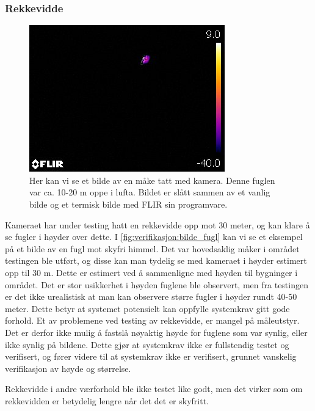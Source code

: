 
\subsubsection{Rekkevidde}\label{sec:verifikasjon:rekkevidde}

\begin{figure}
    \centering
    \includegraphics[width=.42\textwidth]{verifikasjon-test/Kamera/FLIR0059.jpg}
    \caption{Her kan vi se et bilde av en måke tatt med kamera. Denne fuglen var ca. 10-20 m oppe i lufta. Bildet er slått sammen av et vanlig bilde og et termisk bilde med FLIR sin programvare.}
    \label{fig:verifikasjon:bilde_fugl}
\end{figure}

Kameraet har under testing hatt en rekkevidde opp mot 30 meter, og kan klare å se fugler i høyder over dette. 
I \autoref{fig:verifikasjon:bilde_fugl} kan vi se et eksempel på et bilde av en fugl mot skyfri himmel. 
Det var hovedsaklig måker i området testingen ble utført, og disse kan man tydelig se med kameraet i høyder estimert opp til 30 m. 
Dette er estimert ved å sammenligne med høyden til bygninger i området. 
Det er stor usikkerhet i høyden fuglene ble observert, men fra testingen er det ikke urealistisk at man kan observere større fugler i høyder rundt 40-50 meter. 
Dette betyr at systemet potensielt kan oppfylle systemkrav  gitt gode forhold.
Et av problemene ved testing av rekkevidde, er mangel på måleutstyr. 
Det er derfor ikke mulig å fastslå nøyaktig høyde for fuglene som var synlig, eller ikke synlig på bildene.
Dette gjør at systemkrav  ikke er fullstendig testet og verifisert, og fører videre til at systemkrav  ikke er verifisert, grunnet vanskelig verifikasjon av høyde og størrelse.

Rekkevidde i andre værforhold ble ikke testet like godt, men det virker som om rekkevidden er betydelig lengre når det det er skyfritt.

